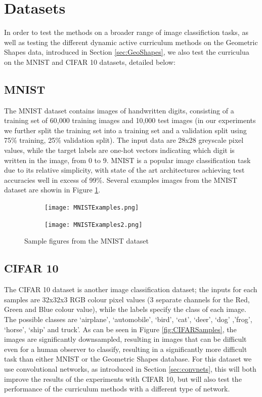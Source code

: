 \section{Datasets}
In order to test the methods on a broader range of image classifiction tasks, as well as testing the different dynamic active curriculum methods on the Geometric Shapes data, introduced in Section \ref{sec:GeoShapes}, we also test the curriculua on the MNIST and CIFAR 10 datasets, detailed below:
\subsection{MNIST}\label{MNIST}
The MNIST dataset \cite{lecun-mnisthandwrittendigit-2010} contains images of handwritten digits, consisting of a training set of 60,000 training images and 10,000 test images (in our experiments we further split the training set into a training set and a validation split using 75\% training, 25\% validation split). The input data are 28x28 greyscale pixel values, while the target labels are one-hot vectors indicating which digit is written in the image, from 0 to 9. MNIST is a popular image classification task due to its relative simplicity, with state of the art architectures achieving test accuracies well in excess of 99\%. Several examples images from the MNIST dataset are showin in Figure \ref{fig:MNISTSamples}.
\begin{figure}[h!]
\hspace*{-2cm}    
\centering
\begin{subfigure}{.6\textwidth}
  \centering
  \texttt{[image: MNISTExamples.png]}
\end{subfigure}%
\begin{subfigure}{.6\textwidth}
  \centering
  \texttt{[image: MNISTExamples2.png]}
\end{subfigure}
\caption{Sample figures from the MNIST dataset}
\label{fig:MNISTSamples}
\end{figure}
\subsection{CIFAR 10}\label{CIFAR10}
The CIFAR 10 dataset \cite{krizhevsky2009learning} is another image classification dataset; the inputs for each samples are 32x32x3 RGB colour pixel values (3 separate channels for the Red, Green and Blue colour value), while the labels specify the class of each image. The possible classes are `airplane', `automobile', `bird', `cat', `deer', `dog' ,'frog', `horse', `ship' and truck'. As can be seen in Figure \ref{fig:CIFARSamples}, the images are significantly downsampled, resulting in images that can be difficult even for a human observer to classify, resulting in a significantly more difficult task than either MNIST or the Geometric Shapes database. For this dataset we use convolutional networks, as introduced in Section \ref{sec:convnets}, this will both improve the results of the experiments with CIFAR 10, but will also test the performance of the curriculum methods with a different type of network.

